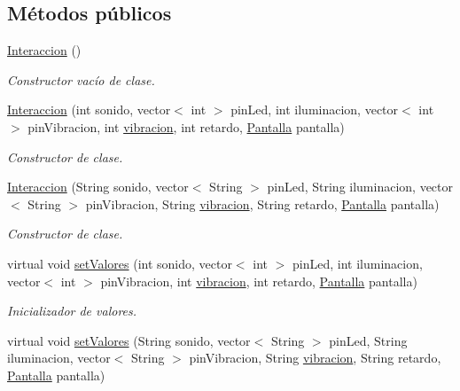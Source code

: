 \subsection*{Métodos públicos}
\begin{DoxyCompactItemize}
\item 
\hyperlink{classInteraccion_a8a59812401c3a6dbe06b424e537be173}{Interaccion} ()
\begin{DoxyCompactList}\small\item\em Constructor vacío de clase. \end{DoxyCompactList}\item 
\hyperlink{classInteraccion_abe22804965bc9c371ed66ccab260e001}{Interaccion} (int sonido, vector$<$ int $>$ pin\+Led, int iluminacion, vector$<$ int $>$ pin\+Vibracion, int \hyperlink{Vibracion_8h_adc29bdc2016021e3f44d420abd54a301}{vibracion}, int retardo, \hyperlink{classPantalla}{Pantalla} pantalla)
\begin{DoxyCompactList}\small\item\em Constructor de clase. \end{DoxyCompactList}\item 
\hyperlink{classInteraccion_a5e5717c198985a4b8402b2111c80d78d}{Interaccion} (String sonido, vector$<$ String $>$ pin\+Led, String iluminacion, vector$<$ String $>$ pin\+Vibracion, String \hyperlink{Vibracion_8h_adc29bdc2016021e3f44d420abd54a301}{vibracion}, String retardo, \hyperlink{classPantalla}{Pantalla} pantalla)
\begin{DoxyCompactList}\small\item\em Constructor de clase. \end{DoxyCompactList}\item 
virtual void \hyperlink{classInteraccion_a2e36a98f93c4df8f5ddada4197ef0323}{set\+Valores} (int sonido, vector$<$ int $>$ pin\+Led, int iluminacion, vector$<$ int $>$ pin\+Vibracion, int \hyperlink{Vibracion_8h_adc29bdc2016021e3f44d420abd54a301}{vibracion}, int retardo, \hyperlink{classPantalla}{Pantalla} pantalla)
\begin{DoxyCompactList}\small\item\em Inicializador de valores. \end{DoxyCompactList}\item 
virtual void \hyperlink{classInteraccion_ac9f35e8ceda5eb33fc1bed64c819ae5f}{set\+Valores} (String sonido, vector$<$ String $>$ pin\+Led, String iluminacion, vector$<$ String $>$ pin\+Vibracion, String \hyperlink{Vibracion_8h_adc29bdc2016021e3f44d420abd54a301}{vibracion}, String retardo, \hyperlink{classPantalla}{Pantalla} pantalla)

\end{DoxyCompactItemize}
